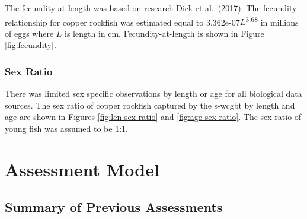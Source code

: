 \documentclass[11pt,
  english,
  a4paper,
]{article}
\begin{document}
\leavevmode\tagmcend\tagstructend\par


The fecundity-at-length was based on research Dick et al.~{(2017)\leavevmode\tagmcend\tagstructend}. The fecundity relationship for copper rockfish was estimated equal to 3.362e-07{\(L\)\leavevmode\tagmcend\tagstructend}\textsuperscript{3.68} in millions of eggs where {\(L\)\leavevmode\tagmcend\tagstructend} is length in cm. Fecundity-at-length is shown in Figure \ref{fig:fecundity}.

\leavevmode\tagmcend\tagstructend\par


\hypertarget{sex-ratio}{%
\subsubsection{Sex Ratio}\label{sex-ratio}}

\leavevmode\tagmcend\tagstructend


There was limited sex specific observations by length or age for all biological data sources. The sex ratio of copper rockfish captured by the \gls{s-wcgbt} by length and age are shown in Figures \ref{fig:len-sex-ratio} and \ref{fig:age-sex-ratio}. The sex ratio of young fish was assumed to be 1:1.

\leavevmode\tagmcend\tagstructend\par


\hypertarget{assessment-model}{%
\section{Assessment Model}\label{assessment-model}}

\leavevmode\tagmcend\tagstructend


\hypertarget{summary-of-previous-assessments}{%
\subsection{Summary of Previous Assessments}\label{summary-of-previous-assessments}}
\end{document}
